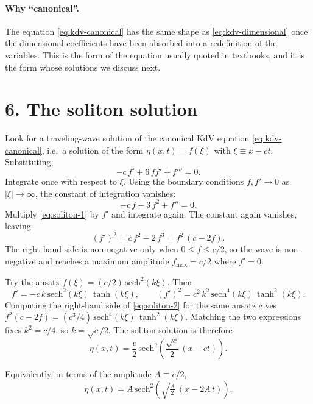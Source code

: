 \documentclass{article}
\begin{document}
\paragraph{Why ``canonical''.} The equation \eqref{eq:kdv-canonical} has the same shape as \eqref{eq:kdv-dimensional} once the dimensional coefficients have been absorbed into a redefinition of the variables. This is the form of the equation usually quoted in textbooks, and it is the form whose solutions we discuss next.

\section*{6. The soliton solution}

Look for a traveling-wave solution of the canonical KdV equation \eqref{eq:kdv-canonical}, i.e.\ a solution of the form \(\eta(x, t) = f(\xi)\) with \(\xi \equiv x - c t\). Substituting,
\[
- c\, f' + 6\, f f' + f''' = 0.
\]
Integrate once with respect to \(\xi\). Using the boundary conditions \(f, f' \to 0\) as \(|\xi| \to \infty\), the constant of integration vanishes:
\begin{equation}
- c\, f + 3\, f^2 + f'' = 0.
\label{eq:soliton-1}
\end{equation}
Multiply \eqref{eq:soliton-1} by \(f'\) and integrate again. The constant again vanishes, leaving
\begin{equation}
(f')^2 = c\, f^2 - 2\, f^3 = f^2\, (c - 2 f).
\label{eq:soliton-2}
\end{equation}
The right-hand side is non-negative only when \(0 \leq f \leq c/2\), so the wave is non-negative and reaches a maximum amplitude \(f_{\max} = c/2\) where \(f' = 0\).

Try the ansatz \(f(\xi) = (c/2)\, \mathrm{sech}^2(k \xi)\). Then
\[
f' = -c\, k\, \mathrm{sech}^2(k\xi)\, \tanh(k\xi), \qquad
(f')^2 = c^2\, k^2\, \mathrm{sech}^4(k\xi)\, \tanh^2(k\xi).
\]
Computing the right-hand side of \eqref{eq:soliton-2} for the same ansatz gives \(f^2(c - 2f) = (c^3/4)\, \mathrm{sech}^4(k\xi)\, \tanh^2(k\xi)\). Matching the two expressions fixes \(k^2 = c/4\), so \(k = \sqrt{c}/2\). The soliton solution is therefore
\begin{equation}
\boxed{\;
\eta(x, t) = \frac{c}{2}\, \mathrm{sech}^2\!\left(\frac{\sqrt{c}}{2}\,(x - c t)\right).
\;}
\label{eq:soliton}
\end{equation}

Equivalently, in terms of the amplitude \(A \equiv c/2\),
\[
\eta(x, t) = A\, \mathrm{sech}^2\!\left(\sqrt{\tfrac{A}{2}}\,(x - 2 A\, t)\right).
\]
\end{document}
